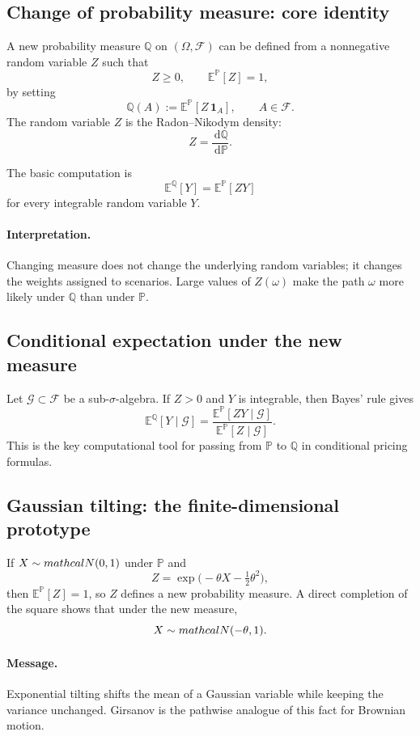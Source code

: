 \documentclass[11pt]{article}
\newcommand{\F}{\mathcal{F}}
\newcommand{\Pbb}{\mathbb{P}}
\newcommand{\Qbb}{\mathbb{Q}}
\newcommand{\E}{\mathbb{E}}
\newcommand{\dd}{\,\mathrm{d}}
\newcommand{\1}{\mathbf{1}}
\theoremstyle{plain}
\theoremstyle{definition}
\theoremstyle{remark}
\begin{document}
\subsection{Change of probability measure: core identity}

A new probability measure $\Qbb$ on $(\Omega,\F)$ can be defined from a nonnegative random variable $Z$ such that
\[
Z\ge 0,
\qquad
\E^{\Pbb}[Z]=1,
\]
by setting
\[
\Qbb(A):=\E^{\Pbb}[Z\,\1_A],
\qquad A\in\F.
\]
The random variable $Z$ is the Radon--Nikodym density:
\[
Z=\frac{\dd \Qbb}{\dd \Pbb}.
\]

The basic computation is
\[
\E^{\Qbb}[Y]=\E^{\Pbb}[ZY]
\]
for every integrable random variable $Y$.

\paragraph{Interpretation.}
Changing measure does not change the underlying random variables; it changes the weights assigned to scenarios.
Large values of $Z(\omega)$ make the path $\omega$ more likely under $\Qbb$ than under $\Pbb$.

\subsection{Conditional expectation under the new measure}

Let $\mathcal G\subset \F$ be a sub-$\sigma$-algebra.
If $Z>0$ and $Y$ is integrable, then Bayes' rule gives
\[
\boxed{
\;
\E^{\Qbb}[Y\mid \mathcal G]
=
\frac{\E^{\Pbb}[ZY\mid \mathcal G]}{\E^{\Pbb}[Z\mid \mathcal G]}.
\;}
\]
This is the key computational tool for passing from $\Pbb$ to $\Qbb$ in conditional pricing formulas.

\subsection{Gaussian tilting: the finite-dimensional prototype}

If $X\sim \\mathcal{N}(0,1)$ under $\Pbb$ and
\[
Z=\exp\!\Big(-\theta X-\tfrac12\theta^2\Big),
\]
then $\E^{\Pbb}[Z]=1$, so $Z$ defines a new probability measure.
A direct completion of the square shows that under the new measure,
\[
X\sim \\mathcal{N}(-\theta,1).
\]

\paragraph{Message.}
Exponential tilting shifts the mean of a Gaussian variable while keeping the variance unchanged.
Girsanov is the pathwise analogue of this fact for Brownian motion.
\end{document}
